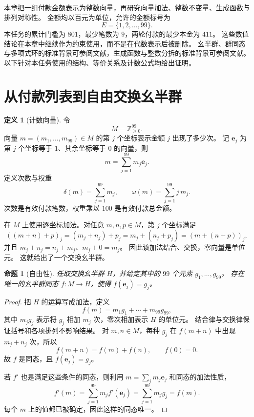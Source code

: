 \documentclass[UTF8,a4paper]{ctexbook}
\newtheorem{proposition}[theorem]{命题}
\theoremstyle{definition}
\newtheorem{definition}[theorem]{定义}
\numberwithin{equation}{chapter}
\newcommand{\1}{\mathbf{1}}
\begin{document}
本章把一组付款金额表示为整数向量，再研究向量加法、整数不变量、生成函数与排列对称性。
金额均以百元为单位，允许的金额标号为
\[
E=\{1,2,\ldots,99\}.
\]
本任务的累计门槛为 \(801\)，最少笔数为 \(9\)，两轮付款的最少本金为 \(411\)。
这些数值结论在本章中继续作为约束使用，而不是在代数表示后被删除。
幺半群、群同态与多项式环的标准背景可参阅文献\cite{judson}，生成函数与整数分拆的标准背景可参阅文献\cite{stanley}。
以下针对本任务使用的结构、等价关系及计数公式均给出证明。

\section{从付款列表到自由交换幺半群}

\begin{definition}[计数向量]\label{aa:count-vector}
令
\[
M=\mathbb Z_{\ge0}^{99}.
\]
向量 \(m=(m_1,\ldots,m_{99})\in M\) 的第 \(j\) 个坐标表示金额 \(j\) 出现了多少次。
记 \(\mathbf e_j\) 为第 \(j\) 个坐标等于 \(1\)、其余坐标等于 \(0\) 的向量，则
\[
m=\sum_{j=1}^{99}m_j\mathbf e_j.
\]
定义次数与权重
\[
\delta(m)=\sum_{j=1}^{99}m_j,
\qquad
\omega(m)=\sum_{j=1}^{99}j\,m_j.
\]
次数是有效付款笔数，权重乘以 \(100\) 是有效付款总金额。
\end{definition}

在 \(M\) 上使用逐坐标加法。对任意 \(m,n,p\in M\)，第 \(j\) 个坐标满足
\[
((m+n)+p)_j=(m_j+n_j)+p_j
=m_j+(n_j+p_j)=(m+(n+p))_j,
\]
并且 \(m_j+n_j=n_j+m_j\)、\(m_j+0=m_j\)。
因此该加法结合、交换，零向量是单位元。
这就给出了一个交换幺半群。

\begin{proposition}[自由性]\label{aa:free-monoid}
任取交换幺半群 \(H\)，并给定其中的 \(99\) 个元素
\(g_1,\ldots,g_{99}\)。
存在唯一的幺半群同态 \(f:M\to H\)，使得
\(f(\mathbf e_j)=g_j\)。
\end{proposition}

\begin{proof}
把 \(H\) 的运算写成加法，定义
\[
f(m)=m_1g_1+\cdots+m_{99}g_{99},
\]
其中 \(m_jg_j\) 表示将 \(g_j\) 相加 \(m_j\) 次，零次相加表示 \(H\) 的单位元。
结合律与交换律保证括号和各项排列不影响结果。
对 \(m,n\in M\)，每种 \(g_j\) 在 \(f(m+n)\) 中出现 \(m_j+n_j\) 次，所以
\[
f(m+n)=f(m)+f(n),
\qquad f(0)=0.
\]
故 \(f\) 是同态，且 \(f(\mathbf e_j)=g_j\)。

若 \(f'\) 也是满足这些条件的同态，则利用
\(m=\sum_jm_j\mathbf e_j\) 和同态的加法性质，
\[
f'(m)=\sum_{j=1}^{99}m_jf'(\mathbf e_j)
=\sum_{j=1}^{99}m_jg_j=f(m).
\]
每个 \(m\) 上的值都已被确定，因此这样的同态唯一。
\end{proof}
\end{document}
